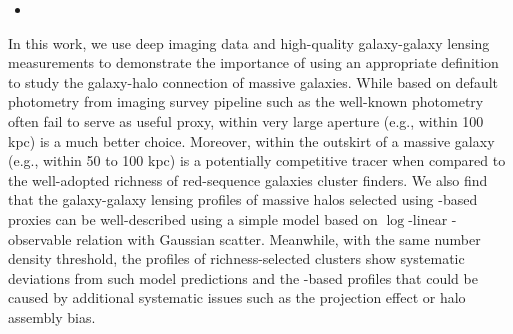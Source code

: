 \documentclass[a4paper,fleqn,usenatbib]{mnras}
\begin{document}
\begin{itemize}
        \item {}

    \end{itemize}


    In this work, we use deep imaging data and high-quality galaxy-galaxy lensing measurements 
    to demonstrate the importance of using an appropriate \mstar{} definition to study the 
    galaxy-halo connection of massive galaxies.
    While \mstar{} based on default photometry from imaging survey pipeline such as the 
    well-known \cmodel{} photometry often fail to serve as useful \mvir{} proxy, \mstar{}
    within very large aperture (e.g., within 100 kpc) is a much better choice.
    Moreover, \mstar{} within the outskirt of a massive galaxy (e.g., \mstar{} within 50 to 100 kpc)
    is a potentially competitive \mvir{} tracer when compared to the well-adopted richness of 
    red-sequence galaxies cluster finders.
    We also find that the galaxy-galaxy lensing \dsigma{} profiles of massive halos selected 
    using \mstar{}-based proxies can be well-described using a simple model based on $\log$-linear
    \mvir{}-observable relation with Gaussian scatter.
    Meanwhile, with the same number density threshold, the \dsigma{} profiles of richness-selected 
    clusters show systematic deviations from such model predictions and the \mstar{}-based profiles 
    that could be caused by additional systematic issues such as the projection effect or 
    halo assembly bias.

\end{document}
